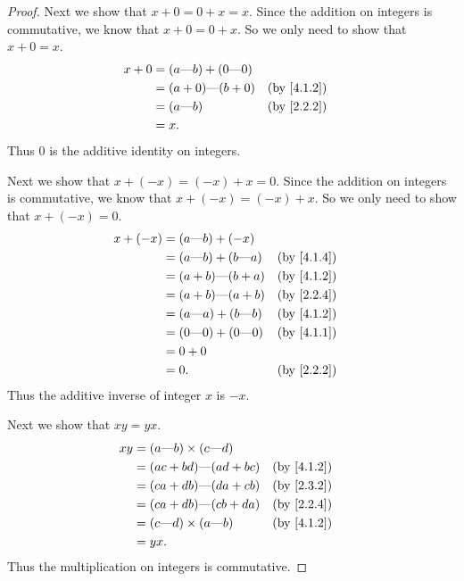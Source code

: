 \begin{proof}
  Next we show that \(x + 0 = 0 + x = x\).
  Since the addition on integers is commutative, we know that \(x + 0 = 0 + x\).
  So we only need to show that \(x + 0 = x\).
  \begin{align*}
    x + 0 & = (a \text{---} b) + (0 \text{---} 0)                               \\
          & = (a + 0) \text{---} (b + 0)          &  & \text{(by \cref{4.1.2})} \\
          & = (a \text{---} b)                    &  & \text{(by \cref{2.2.2})} \\
          & = x.
  \end{align*}
  Thus \(0\) is the additive identity on integers.

  Next we show that \(x + (-x) = (-x) + x = 0\).
  Since the addition on integers is commutative, we know that \(x + (-x) = (-x) + x\).
  So we only need to show that \(x + (-x) = 0\).
  \begin{align*}
    x + (-x) & = (a \text{---} b) + (-x)                                           \\
             & = (a \text{---} b) + (b \text{---} a) &  & \text{(by \cref{4.1.4})} \\
             & = (a + b) \text{---} (b + a)          &  & \text{(by \cref{4.1.2})} \\
             & = (a + b) \text{---} (a + b)          &  & \text{(by \cref{2.2.4})} \\
             & = (a \text{---} a) + (b \text{---} b) &  & \text{(by \cref{4.1.2})} \\
             & = (0 \text{---} 0) + (0 \text{---} 0) &  & \text{(by \cref{4.1.1})} \\
             & = 0 + 0                                                             \\
             & = 0.                                  &  & \text{(by \cref{2.2.2})}
  \end{align*}
  Thus the additive inverse of integer \(x\) is \(-x\).

  Next we show that \(xy = yx\).
  \begin{align*}
    xy & = (a \text{---} b) \times (c \text{---} d)                               \\
       & = (ac + bd) \text{---} (ad + bc)           &  & \text{(by \cref{4.1.2})} \\
       & = (ca + db) \text{---} (da + cb)           &  & \text{(by \cref{2.3.2})} \\
       & = (ca + db) \text{---} (cb + da)           &  & \text{(by \cref{2.2.4})} \\
       & = (c \text{---} d) \times (a \text{---} b) &  & \text{(by \cref{4.1.2})} \\
       & = yx.
  \end{align*}
  Thus the multiplication on integers is commutative.


\end{proof}
